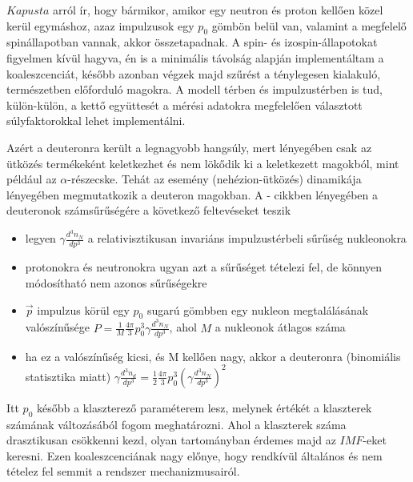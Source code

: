 \documentclass[a4paper,12pt]{article}
\begin{document}
\vspace{5mm}

\par $Kapusta$ \cite{kaposzta} arról ír, hogy bármikor, amikor egy neutron és proton kellően közel kerül egymáshoz, azaz impulzusok egy $p_{0}$ gömbön belül van, valamint a megfelelő spinállapotban vannak, akkor összetapadnak. A spin- és izospin-állapotokat figyelmen kívül hagyva, én is a minimális távolság alapján implementáltam a koaleszcenciát, később azonban végzek majd szűrést a ténylegesen kialakuló, természetben előforduló magokra. A modell térben és impulzustérben is tud, külön-külön, a kettő együttesét a mérési adatokra megfelelően választott súlyfaktorokkal lehet implementálni.

\vspace{5mm}

\par Azért a deuteronra került a legnagyobb hangsúly, mert lényegében csak az ütközés termékeként keletkezhet és nem lökődik ki a keletkezett magokból, mint például az $\alpha$-részecske. Tehát az esemény (nehézion-ütközés) dinamikája lényegében megmutatkozik a deuteron magokban. A \cite{kaposzta} - cikkben lényegében a deuteronok számsűrűségére a következő feltevéseket teszik

\vspace{5mm}

\begin{itemize}
\item legyen $\gamma \frac{d^{3}n_{N}}{dp^{3}}$ a relativisztikusan invariáns impulzustérbeli sűrűség nukleonokra
\item protonokra és neutronokra ugyan azt a sűrűséget tételezi fel, de könnyen módosítható nem azonos sűrűségekre
\item $\vec{p}$ impulzus körül egy $p_{0}$ sugarú gömbben egy nukleon megtalálásának valószínűsége $P = \frac{1}{M}\frac{4\pi}{3}p_{0}^{3}\gamma \frac{d^{3}n_{N}}{dp^{3}}$, ahol $M$ a nukleonok átlagos száma
\item ha ez a valószínűség kicsi, és M kellően nagy, akkor a deuteronra (binomiális statisztika miatt) $\gamma \frac{d^{3}n_{d}}{dp^{3}} = \frac{1}{2}\frac{4\pi}{3}p_{0}^{3}(\gamma \frac{d^{3}n_{N}}{dp^{3}})^{2}$
\end{itemize}

\vspace{5mm}

\par Itt $p_{0}$ később a klaszterező paraméterem lesz, melynek értékét a klaszterek számának változásából fogom meghatározni. Ahol a klaszterek száma drasztikusan csökkenni kezd, olyan tartományban érdemes majd az $IMF$-eket keresni. Ezen koaleszcenciának nagy előnye, hogy rendkívül általános és nem tételez fel semmit a rendszer mechanizmusairól.
\end{document}
